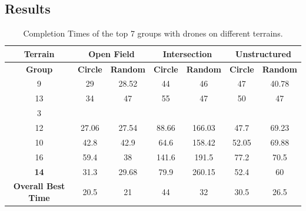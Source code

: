 \documentclass[a4paper,12pt]{article}
\begin{document}
\subsection{Results}


\begin{table}[!hptb]
  \centering
  \begin{tabular}{|c|c|c|c|c|c|c|}
    \hline
    \textbf{Terrain} & \multicolumn{2}{|c|}{\textbf{Open Field}} & \multicolumn{2}{|c|}{\textbf{Intersection}} & \multicolumn{2}{|c|}{\textbf{Unstructured}} \\
    \hline
    \textbf{Group} & \textbf{Circle} & \textbf{Random} & \textbf{Circle} & \textbf{Random} & \textbf{Circle} & \textbf{Random} \\
    \hline
    9 & 29 & 28.52 & 44 & 46 & 47 & 40.78 \\
    \hline
    13 & 34 & 47 & 55 & 47 & 50 & 47 \\
    \hline
    3 & \color{blue}{20.5} & \color{blue}{21} & \color{red}{287} & \color{blue}{32} & \color{blue}{30.5} & \color{blue}{26.5} \\
    \hline
    12 & 27.06 & 27.54 & 88.66 & 166.03 & 47.7 & 69.23 \\
    \hline
    10 & 42.8 & 42.9 & 64.6 & 158.42 & 52.05 & 69.88 \\
    \hline
    16 & 59.4 & 38 & 141.6 & 191.5 & 77.2 & 70.5 \\
    \hline
    \textbf{14} & 31.3 & 29.68 & 79.9 & 260.15 & 52.4 & 60 \\
    \hline
    \textbf{Overall Best Time} & 20.5 & 21 & 44 & 32 & 30.5 & 26.5 \\
    \hline
  \end{tabular}
  \caption{Completion Times of the top 7 groups with drones on different terrains.}
  \label{tab:results_drone_CA}
\end{table}
\end{document}
